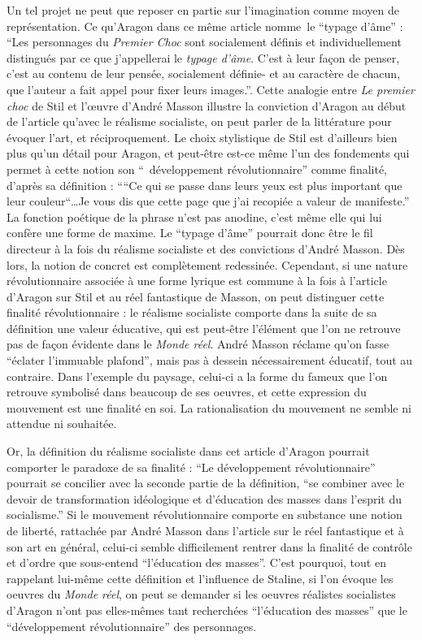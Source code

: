 	Un tel projet ne peut que reposer en partie sur l’imagination comme moyen de représentation. Ce qu’Aragon dans ce même article nomme le \enquote{typage d’âme} : \enquote{Les personnages du \emph{Premier Choc} sont socialement définis et individuellement distingués par ce que j’appellerai le \emph{typage d’âme}. C’est à leur façon de penser, c’est au contenu de leur pensée, socialement définie- et au caractère de chacun, que l’auteur a fait appel pour fixer leurs images.}. Cette analogie entre \emph{Le premier choc} de Stil et l’\oe{}uvre d’André Masson illustre la conviction d’Aragon au début de l’article qu’avec le réalisme socialiste, on peut parler de la littérature pour évoquer l’art, et réciproquement.  Le choix stylistique de Stil est d’ailleurs bien plus qu’un détail pour Aragon, et peut-être est-ce même l’un des fondements qui permet à cette notion son \enquote{ développement révolutionnaire} comme finalité, d’après sa définition : \enquote{“Ce qui se passe dans leurs yeux est plus important que leur couleur“…Je vous dis que cette page que j’ai recopiée a valeur de manifeste.} La fonction poétique de la phrase n’est pas anodine, c’est même elle qui lui confère une forme de maxime. Le \enquote{typage d’âme} pourrait donc être le fil directeur à la fois du réalisme socialiste et des convictions d’André Masson. Dès lors, la notion de concret est complètement redessinée. Cependant, si une nature révolutionnaire associée à une forme lyrique est commune à la fois à l’article d’Aragon sur Stil et au réel fantastique de Masson, on peut distinguer cette finalité révolutionnaire : le réalisme socialiste comporte dans la suite de sa définition une valeur éducative, qui est peut-être l’élément que l’on ne retrouve pas de façon évidente dans le \emph{Monde réel}. André Masson réclame qu'on fasse \enquote{éclater l’immuable plafond}, mais pas à dessein nécessairement éducatif, tout au contraire. Dans l’exemple du paysage, celui-ci a la forme du fameux que l’on retrouve symbolisé dans beaucoup de ses oeuvres, et cette expression du mouvement est une finalité en soi. La rationalisation du mouvement ne semble ni attendue ni souhaitée. 

Or, la définition du réalisme socialiste dans cet article d’Aragon pourrait comporter le paradoxe de sa finalité : \enquote{Le développement révolutionnaire} pourrait se concilier avec la seconde partie de la définition, \enquote{se combiner avec le devoir de transformation idéologique et d’éducation des masses dans l’esprit du socialisme.} Si le mouvement révolutionnaire comporte en substance une notion de liberté, rattachée par André Masson dans l’article sur le réel fantastique et à son art en général, celui-ci semble difficilement rentrer dans la finalité de contrôle et d’ordre que sous-entend \enquote{l’éducation des masses}. C’est pourquoi, tout en rappelant lui-même cette définition et l’influence de Staline, si l’on évoque les oeuvres du \emph{Monde réel}, on peut se demander si les oeuvres réalistes socialistes d’Aragon n’ont pas elles-mêmes tant recherchées \enquote{l’éducation des masses} que le \enquote{développement révolutionnaire} des personnages. 

